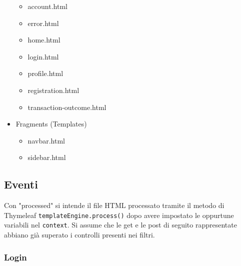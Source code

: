 \documentclass{article}
\begin{document}
\begin{itemize}
\begin{itemize}
		\item account.html
		\item error.html
		\item home.html
		\item login.html
		\item profile.html
		\item registration.html
		\item transaction-outcome.html
	\end{itemize}
	\item Fragments (Templates)
	\begin{itemize}
		\item navbar.html
		\item sidebar.html
	\end{itemize}
\end{itemize}

\subsection{Eventi}
Con "processed" si intende il file HTML processato tramite il metodo di Thymeleaf \texttt{templateEngine.process()} dopo avere impostato le oppurtune variabili nel \texttt{context}. Si assume che le get e le post di seguito rappresentate abbiano già superato i controlli presenti nei filtri.
\subsubsection{Login}
\end{document}
